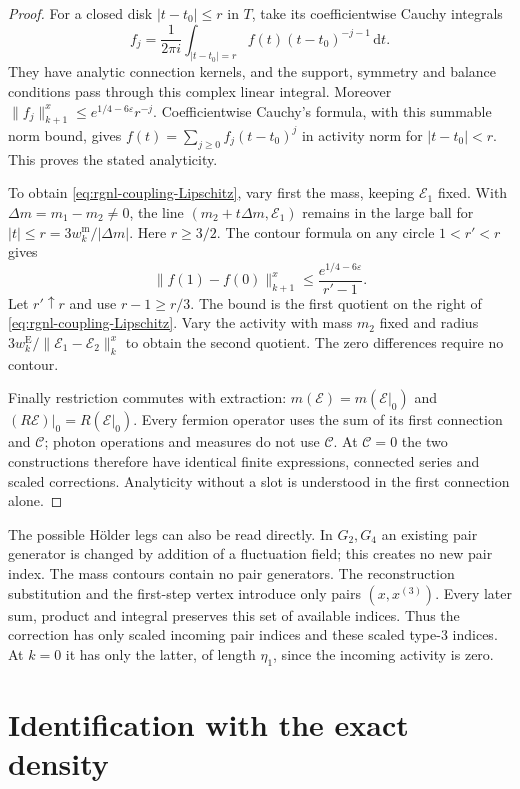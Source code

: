 \documentclass[11pt,letterpaper,reqno]{amsart}
\newcommand{\dd}{\mathrm d}
\begin{document}
\begin{proof}
For a closed disk $|t-t_0|\le r$ in $T$, take its
coefficientwise Cauchy integrals
\[
 f_j=\frac1{2\pi i}\int_{|t-t_0|=r}
                             f(t)(t-t_0)^{-j-1}\,\dd t.
\]
They have analytic connection kernels, and the support,
symmetry and balance conditions pass through this
complex linear integral. Moreover
$\|f_j\|_{k+1}^x\le e^{1/4-6\varepsilon}r^{-j}$.
Coefficientwise Cauchy's formula, with this summable
norm bound, gives
$f(t)=\sum_{j\ge0}f_j(t-t_0)^j$ in activity norm for
$|t-t_0|<r$. This proves the stated analyticity.

To obtain \eqref{eq:rgnl-coupling-Lipschitz}, vary first
the mass, keeping $\mathscr E_1$ fixed. With
$\Delta m=m_1-m_2\ne0$, the line
$(m_2+t\Delta m,\mathscr E_1)$ remains in the large
ball for $|t|\le r=3w_k^{\mathrm m}/|\Delta m|$.
Here $r\ge3/2$. The contour formula on any circle
$1<r'<r$ gives
\[
 \|f(1)-f(0)\|_{k+1}^x
        \le\frac{e^{1/4-6\varepsilon}}{r'-1}.
\]
Let $r'\uparrow r$ and use $r-1\ge r/3$.
The bound is the first quotient on the right of
\eqref{eq:rgnl-coupling-Lipschitz}.
Vary the activity with mass $m_2$ fixed and radius
$3w_k^{\mathrm E}/\|\mathscr E_1-\mathscr E_2\|_k^x$
to obtain the second quotient.
The zero differences require no contour.

Finally restriction commutes with extraction:
$m(\mathscr E)=m(\mathscr E|_0)$ and
$(R\mathscr E)|_0=R(\mathscr E|_0)$.
Every fermion operator uses the sum of its first
connection and $\mathscr C$; photon operations and
measures do not use $\mathscr C$.
At $\mathscr C=0$ the two constructions therefore have
identical finite expressions, connected series and
scaled corrections. Analyticity without a slot is
understood in the first connection alone.
\end{proof}

The possible H\"older legs can also be read directly.
In $G_2,G_4$ an existing pair generator is changed by
addition of a fluctuation field; this creates no new
pair index. The mass contours contain no pair
generators. The reconstruction substitution and the
first-step vertex introduce only pairs $(x,x^{(3)})$.
Every later sum, product and integral preserves this
set of available indices. Thus the correction has
only scaled incoming pair indices and these scaled
type-$3$ indices. At $k=0$ it has only the latter,
of length $\eta_1$, since the incoming activity is zero.

\section{Identification with the exact density}
\label{subsec:rgnl-current-step}
\end{document}
